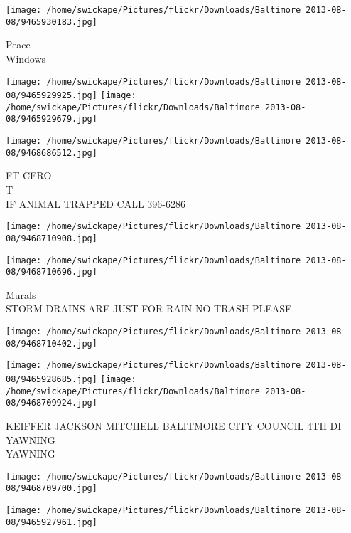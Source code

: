 \documentclass[10pt,letterpaper]{article}
\begin{document}
\vspace{0.25in}
\texttt{[image: /home/swickape/Pictures/flickr/Downloads/Baltimore 2013-08-08/9465930183.jpg]}

Peace\\
Windows\\
\pagebreak

\texttt{[image: /home/swickape/Pictures/flickr/Downloads/Baltimore 2013-08-08/9465929925.jpg]}
\texttt{[image: /home/swickape/Pictures/flickr/Downloads/Baltimore 2013-08-08/9465929679.jpg]}

\texttt{[image: /home/swickape/Pictures/flickr/Downloads/Baltimore 2013-08-08/9468686512.jpg]}

FT CERO\\
T\\
IF ANIMAL TRAPPED CALL 396{-}6286\\
\pagebreak

\texttt{[image: /home/swickape/Pictures/flickr/Downloads/Baltimore 2013-08-08/9468710908.jpg]}

\vspace{0.25in}
\texttt{[image: /home/swickape/Pictures/flickr/Downloads/Baltimore 2013-08-08/9468710696.jpg]}

Murals\\
STORM DRAINS ARE JUST FOR RAIN NO TRASH PLEASE\\
\pagebreak

\texttt{[image: /home/swickape/Pictures/flickr/Downloads/Baltimore 2013-08-08/9468710402.jpg]}

\vspace{0.25in}
\texttt{[image: /home/swickape/Pictures/flickr/Downloads/Baltimore 2013-08-08/9465928685.jpg]}
\texttt{[image: /home/swickape/Pictures/flickr/Downloads/Baltimore 2013-08-08/9468709924.jpg]}

KEIFFER JACKSON MITCHELL BALITMORE CITY COUNCIL 4TH DI\\
YAWNING\\
YAWNING\\
\pagebreak

\texttt{[image: /home/swickape/Pictures/flickr/Downloads/Baltimore 2013-08-08/9468709700.jpg]}

\vspace{0.25in}
\texttt{[image: /home/swickape/Pictures/flickr/Downloads/Baltimore 2013-08-08/9465927961.jpg]}
\end{document}
